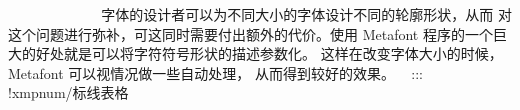 ~%
~%
~%
~%
~%
~%
~%
~%
字体的设计者可以为不同大小的字体设计不同的轮廓形状，从而
对这个问题进行弥补，可这同时需要付出额外的代价。使用 Metafont
程序的一个巨大的好处就是可以将字符符号形状的描述参数化。
这样在改变字体大小的时候，Metafont 可以视情况做一些自动处理，
从而得到较好的效果。
~%
\bye %
:::
~
~%
\xmpheader !xmpnum/{标线表格}%
\bigskip
~%
\offinterlineskip %
~%
\def\tablerule{\noalign{\hrule}}
~%
\def\tableskip{\omit&height 9pt&&&\omit\cr}
~%
~%
~%
~%
~%
~%
~%
~%
~%
~%
